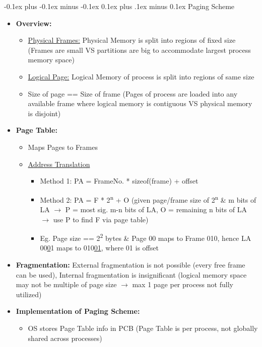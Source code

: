 \documentclass[landscape]{article}
\makeatletter
\renewcommand{\subsection}{\@startsection{subsection}{2}{0mm}%
  {-0.1ex plus -0.1ex minus -0.1ex}%
  {0.1ex plus .1ex minus 0.1ex}%
{\normalfont\scriptsize\bfseries}}
\makeatother
\begin{document}
\begin{multicols*}{6}
    \subsection{Paging Scheme}
    \begin{itemize}
      \item \textbf{Overview:}
      \begin{itemize}
        \item \underline{Physical Frames:} Physical Memory is split into regions of fixed size (Frames are small VS partitions are big to accommodate largest process memory space)
        \item \underline{Logical Page:} Logical Memory of process is split into regions of same size
        \item Size of page == Size of frame (Pages of process are loaded into any available frame where logical memory is contiguous VS physical memory is disjoint)
      \end{itemize}
      \item \textbf{Page Table:}
      \begin{itemize}
        \item Maps Pages to Frames
        \item \underline{Address Translation}
        \begin{itemize}
          \item Method 1: PA = FrameNo. * sizeof(frame) + offset
          \item Method 2: PA = F * 2\textsuperscript{n} + O (given page/frame size of 2\textsuperscript{n} \& m bits of LA $\rightarrow$ P = most sig. m-n bits of LA, O = remaining n bits of LA $\rightarrow$ use P to find F via page table)
          \item Eg. Page size == 2\textsuperscript{2} bytes \& Page 00 maps to Frame 010, hence LA 00\underline{0}1 maps to 010\underline{01}, where 01 is offset
        \end{itemize}
      \end{itemize}
      \item \textbf{Fragmentation:} External fragmentation is not possible (every free frame can be used), Internal fragmentation is insignificant (logical memory space may not be multiple of page size $\rightarrow$ max 1 page per process not fully utilized)
      \item \textbf{Implementation of Paging Scheme:}
      \begin{itemize}
        \item OS stores Page Table info in PCB (Page Table is per process, not globally shared across processes)

\end{itemize}
\end{itemize}
\end{multicols*}
\end{document}
